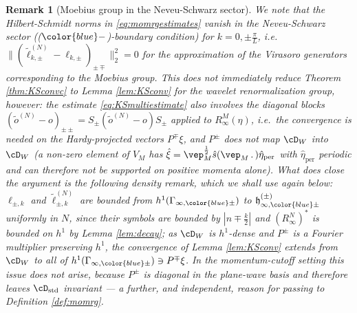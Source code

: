 \documentclass[a4paper, 11pt]{article}
\newcommand{\fh}{\mathfrak{h}}
\DeclareMathOperator{\1}{\mathds{1}}
\DeclareMathOperator{\std}{std}
\DeclareMathOperator{\per}{per}
\newtheorem{rem}[thm]{Remark}
\begin{document}
\begin{rem}[Moebius group in the Neveu-Schwarz sector]
\label{rem:moeberror}
We note that the Hilbert-Schmidt norms in \eqref{eq:momrgestimates} vanish in the Neveu-Schwarz sector ((${\color{blue}-}$)-boundary condition) for $k=0,\pm\tfrac{\pi}{L}$, i.e.~$\|(\tilde{\ell}^{(N)}_{k,\pm}-\ell_{k,\pm})_{\pm\mp}\|_{2}^{2}=0$ for the approximation of the Virasoro generators corresponding to the Moebius group. This does \emph{not} immediately reduce Theorem \ref{thm:KSconvc} to Lemma \ref{lem:KSconv} for the wavelet renormalization group, however: the estimate \eqref{eq:KSmultiestimate} also involves the diagonal blocks $(\tilde{o}^{(N)}-o)_{\pm\pm} = S_{\pm}(\tilde{o}^{(N)}-o)S_{\pm}$ applied to $R^{M}_{\infty}(\eta)$, i.e.~the convergence is needed on the Hardy-projected vectors $P^{\mp}\xi$, and $P^{\pm}$ does not map $\cD_{W}$ into $\cD_{W}$ (a non-zero element of $V_{M}$ has $\hat{\xi} = \vep_{M}^{\frac{1}{2}}\hat{s}(\vep_{M}\!\ .\!\ )\hat{\eta}_{\per}$ with $\hat{\eta}_{\per}$ periodic and can therefore not be supported on positive momenta alone). What does close the argument is the following density remark, which we shall use again below: $\ell_{\pm,k}$ and $\tilde{\ell}^{(N)}_{\pm,k}$ are bounded from $h^{1}(\Gamma_{\infty,{\color{blue}\pm}})$ to $\fh^{(\pm)}_{\infty,{\color{blue}\pm}}$ \emph{uniformly in $N$}, since their symbols are bounded by $|n\mp\tfrac{k}{2}|$ and $(R^{N}_{\infty})^{*}$ is bounded on $h^{1}$ by Lemma \ref{lem:decay}; as $\cD_{W}$ is $h^{1}$-dense and $P^{\pm}$ is a Fourier multiplier preserving $h^{1}$, the convergence of Lemma \ref{lem:KSconv} extends from $\cD_{W}$ to all of $h^{1}(\Gamma_{\infty,{\color{blue}\pm}})\ni P^{\mp}\xi$. In the momentum-cutoff setting this issue does not arise, because $P^{\pm}$ is diagonal in the plane-wave basis and therefore leaves $\cD_{\std}$ invariant --- a further, and independent, reason for passing to Definition \ref{def:momrg}.
\end{rem}
\end{document}

